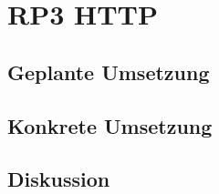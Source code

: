 \section{RP3 HTTP}
\label{sec:principle-rp3-http}

\subsection*{Geplante Umsetzung}


\subsection*{Konkrete Umsetzung}


\subsection*{Diskussion}
